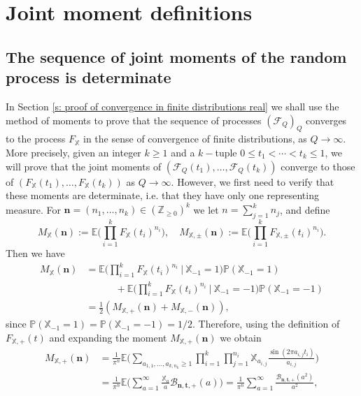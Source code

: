 \documentclass[10pt]{amsart}
\let\Subsection\subsection
\theoremstyle{plain}
\theoremstyle{definition}
\newcommand{\X}{\mathbb{X}}
\newcommand{\pr}{\mathbb{P}}
\begin{document}
\section{Joint moment definitions}
\setcounter{subsection}{1}
\Subsection{The sequence of joint moments of the random process is determinate}\label{s: the limiting moment}
In Section \ref{s: proof of convergence in finite distributions real} we shall use the method of moments to prove that the sequence of processes $(\mathcal{F}_{Q})_Q$ converges to the process $F_{\X}$ in the sense of convergence of finite distributions, as $Q\to \infty$. More precisely, given an integer $k \geq 1$ and a $k-$tuple $0 \leq t_1 < \cdots < t_k \leq 1$, we will prove that the joint moments of $(\mathcal{F}_{Q}(t_1), \dots, \mathcal{F}_{Q}(t_k)) $
converge to those of $(F_{\X}(t_1), \dots, F_{\X}(t_k))$ as $Q\to \infty$. However, we first need to verify that these moments are determinate, i.e. that they have only one representing measure. For $\boldsymbol{n}=(n_1, \dots, n_k)\in (\mathbb{Z}_{\geq 0})^k$ we let $n= \sum_{j=1}^k n_j$, and define
\begin{equation}\label{eq: limiting moment}
M_{\X}(\boldsymbol{n}):= \mathbb{E}\biggl( \prod_{i = 1}^k F_{\X}(t_i)^{n_i} \biggr), \quad
M_{\X,\pm}(\boldsymbol{n}):= \mathbb{E}\biggl( \prod_{i = 1}^k F_{\X,\pm}(t_i)^{n_i} \biggr).
\end{equation}
Then we have
\begin{equation}\label{eq: MomentRandomPM}
\begin{aligned}
M_{\X}(\boldsymbol{n})&= \mathbb{E}\biggl( \prod_{i = 1}^k F_{\X}(t_i)^{n_i} \ \Big| \ \X_{-1}=1\biggr) \pr(\X_{-1}=1) \\
& \quad \quad \quad +\mathbb{E}\biggl( \prod_{i = 1}^k F_{\X}(t_i)^{n_i} \ \Big| \ \X_{-1}=-1\biggr) \pr(\X_{-1}=-1)\\
& =\frac{1}{2}\left(M_{\X,+}(\boldsymbol{n})+ M_{\X,-}(\boldsymbol{n})\right),
\end{aligned}
\end{equation}
since $\pr(\X_{-1}=1)= \pr(\X_{-1}=-1)=1/2.$
Therefore, using the definition of $F_{\X,+}(t)$ and expanding the moment $M_{\X,+}(\boldsymbol{n})$ we obtain
\begin{equation}\label{eq: FormulaMomentRandom+}
\begin{aligned}
M_{\X,+}(\boldsymbol{n}) &= \frac{1}{\pi^{n}} \mathbb{E} \biggl( \sum_{a_{1,1}, \dots, a_{k,n_k} \geq 1} \prod_{i = 1}^k \prod_{j = 1}^{n_i} \X_{a_{i,j}} \frac{\sin(2 \pi a_{i,j}t_i)}{a_{i,j}}\biggr)\\ & = \frac{1}{\pi^{n}} \mathbb{E} \biggl(\sum_{a=1}^{\infty} \frac{\X_a}{a}\mathcal{B}_{\boldsymbol{n},\mathbf{t}, +}(a)\biggr)= \frac{1}{\pi^{n}} \sum_{a=1}^{\infty} \frac{\mathcal{B}_{\boldsymbol{n},\mathbf{t}, +}(a^2)}{a^2},
\end{aligned}
\end{equation}
\end{document}
